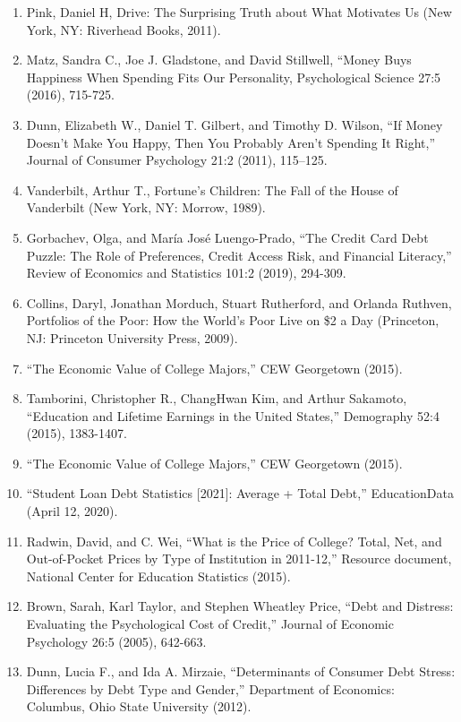 \begin{enumerate}
\item\hypertarget{endnote:27}{} Pink, Daniel H, Drive: The Surprising Truth about What Motivates Us (New York, NY: Riverhead Books, 2011).
\item\hypertarget{endnote:28}{} Matz, Sandra C., Joe J. Gladstone, and David Stillwell, “Money Buys Happiness When Spending Fits Our Personality, Psychological Science 27:5 (2016), 715-725.
\item\hypertarget{endnote:29}{} Dunn, Elizabeth W., Daniel T. Gilbert, and Timothy D. Wilson, “If Money Doesn’t Make You Happy, Then You Probably Aren’t Spending It Right,” Journal of Consumer Psychology 21:2 (2011), 115–125.
\item\hypertarget{endnote:30}{} Vanderbilt, Arthur T., Fortune’s Children: The Fall of the House of Vanderbilt (New York, NY: Morrow, 1989).
\item\hypertarget{endnote:31}{} Gorbachev, Olga, and María José Luengo-Prado, “The Credit Card Debt Puzzle: The Role of Preferences, Credit Access Risk, and Financial Literacy,” Review of Economics and Statistics 101:2 (2019), 294-309.
\item\hypertarget{endnote:32}{} Collins, Daryl, Jonathan Morduch, Stuart Rutherford, and Orlanda Ruthven, Portfolios of the Poor: How the World’s Poor Live on \$2 a Day (Princeton, NJ: Princeton University Press, 2009).
\item\hypertarget{endnote:33}{} “The Economic Value of College Majors,” CEW Georgetown (2015).
\item\hypertarget{endnote:34}{} Tamborini, Christopher R., ChangHwan Kim, and Arthur Sakamoto, “Education and Lifetime Earnings in the United States,” Demography 52:4 (2015), 1383-1407.
\item\hypertarget{endnote:35}{} “The Economic Value of College Majors,” CEW Georgetown (2015).
\item\hypertarget{endnote:36}{} “Student Loan Debt Statistics [2021]: Average + Total Debt,” EducationData (April 12, 2020).
\item\hypertarget{endnote:37}{} Radwin, David, and C. Wei, “What is the Price of College? Total, Net, and Out-of-Pocket Prices by Type of Institution in 2011-12,” Resource document, National Center for Education Statistics (2015).
\item\hypertarget{endnote:38}{} Brown, Sarah, Karl Taylor, and Stephen Wheatley Price, “Debt and Distress: Evaluating the Psychological Cost of Credit,” Journal of Economic Psychology 26:5 (2005), 642-663.
\item\hypertarget{endnote:39}{} Dunn, Lucia F., and Ida A. Mirzaie, “Determinants of Consumer Debt Stress: Differences by Debt Type and Gender,” Department of Economics: Columbus, Ohio State University (2012).

\end{enumerate}
